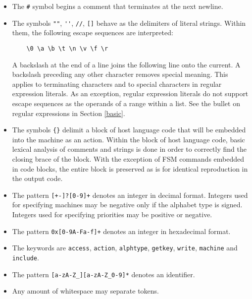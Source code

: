 \documentclass[letterpaper,11pt,oneside]{book}
\begin{document}
\begin{itemize}

\item The \verb|#| symbol begins a comment that terminates at the next newline.

\item The symbols \verb|""|, \verb|''|, \verb|//|, \verb|[]| behave as the
delimiters of literal strings. Within them, the following escape sequences 
are interpreted: 

\verb|    \0 \a \b \t \n \v \f \r|

A backslash at the end of a line joins the following line onto the current. A
backslash preceding any other character removes special meaning. This applies
to terminating characters and to special characters in regular expression
literals. As an exception, regular expression literals do not support escape
sequences as the operands of a range within a list. See the bullet on regular
expressions in Section \ref{basic}.

\item The symbols \verb|{}| delimit a block of host language code that will be
embedded into the machine as an action.  Within the block of host language
code, basic lexical analysis of comments and strings is done in order to
correctly find the closing brace of the block. With the exception of FSM
commands embedded in code blocks, the entire block is preserved as is for
identical reproduction in the output code.

\item The pattern \verb|[+-]?[0-9]+| denotes an integer in decimal format.
Integers used for specifying machines may be negative only if the alphabet type
is signed. Integers used for specifying priorities may be positive or negative.

\item The pattern \verb|0x[0-9A-Fa-f]+| denotes an integer in hexadecimal
format.

\item The keywords are \verb|access|, \verb|action|, \verb|alphtype|,
\verb|getkey|, \verb|write|, \verb|machine| and \verb|include|.

\item The pattern \verb|[a-zA-Z_][a-zA-Z_0-9]*| denotes an identifier.

%

\item Any amount of whitespace may separate tokens.

\end{itemize}
\end{document}
